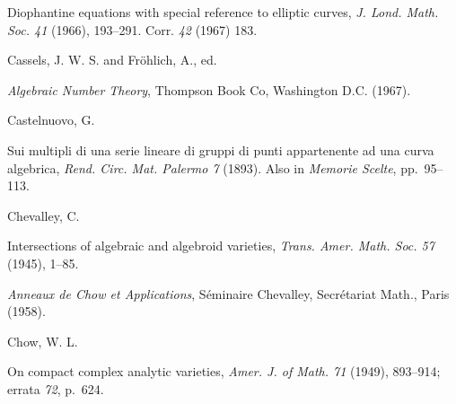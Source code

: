 {\noindent\hangindent=25bp\hspace*{6bp}%
Diophantine equations with special reference to elliptic curves, \emph{J. Lond. Math. Soc. 41} (1966), 193--291. Corr. \emph{42} (1967) 183.\par
\par\vspace{2.15pt}\noindent \hypertarget{bib-474-12}{}Cassels, J. W. S. and Fr\"ohlich, A., ed.\par
\noindent\hangindent=25bp\hspace*{6bp}%
\emph{Algebraic Number Theory}, Thompson Book Co, Washington D.C. (1967).\par
\par\vspace{2.15pt}\noindent \hypertarget{bib-474-13}{}Castelnuovo, G.\par
\noindent\hangindent=25bp\hspace*{6bp}%
Sui multipli di una serie lineare di gruppi di punti appartenente ad una curva algebrica, \emph{Rend. Circ. Mat. Palermo 7} (1893). Also in \emph{Memorie Scelte}, pp.~95--113.\par
\par\vspace{2.15pt}\noindent \hypertarget{bib-474-14}{}Chevalley, C.\par
\noindent\hangindent=25bp\hspace*{6bp}%
Intersections of algebraic and algebroid varieties, \emph{Trans. Amer. Math. Soc. 57} (1945), 1--85.\par
\noindent\hangindent=25bp\hspace*{6bp}%
\emph{Anneaux de Chow et Applications}, S\'eminaire Chevalley, Secr\'etariat Math., Paris (1958).\par
\par\vspace{2.15pt}\noindent \hypertarget{bib-474-16}{}Chow, W. L.\par
\noindent\hangindent=25bp\hspace*{6bp}%
On compact complex analytic varieties, \emph{Amer. J. of Math. 71} (1949), 893--914; errata \emph{72}, p.~624.\par
}
